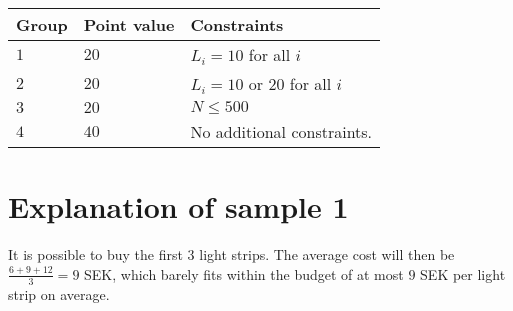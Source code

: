 \noindent
\begin{tabular}{| l | l | p{12cm} |}
  \hline
  \textbf{Group} & \textbf{Point value} & \textbf{Constraints} \\ \hline
  $1$    & $20$       & $L_i=10$ for all $i$ \\ \hline
  $2$    & $20$       & $L_i=10$ or $20$ for all $i$ \\ \hline
  $3$    & $20$       & $N \leq 500$ \\ \hline
  $4$    & $40$       & No additional constraints. \\ \hline
\end{tabular}

\section*{Explanation of sample 1}
It is possible to buy the first 3 light strips.
The average cost will then be $\frac{6+9+12}{3}=9$ SEK, which barely fits within the budget of at most $9$ SEK per light strip on average.
